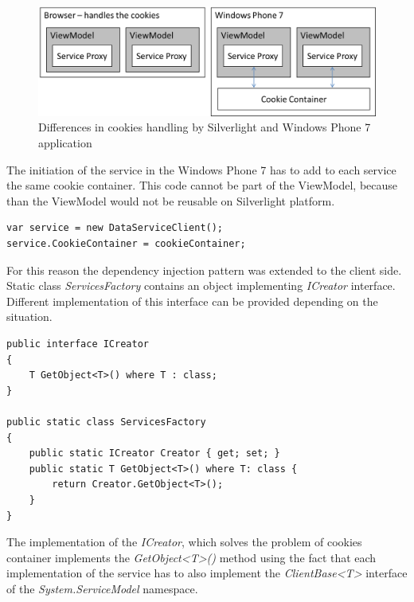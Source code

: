 \begin{figure}[h]
\begin{center}
\includegraphics[width=14cm]{figures/cookies_situation}
\caption{Differences in cookies handling by Silverlight and Windows Phone 7 application}
\label{fig:cookies_situation}
\end{center}
\end{figure}

The initiation of the service in the Windows Phone 7 has to add to each service the same cookie container. This code cannot be part of the ViewModel, because than the ViewModel would not be reusable on Silverlight platform.

\begin{verbatim}
var service = new DataServiceClient();
service.CookieContainer = cookieContainer;
\end{verbatim}

For this reason the dependency injection pattern was extended to the client side. Static class \textit{ServicesFactory} contains an object implementing \textit{ICreator} interface. Different implementation of this interface can be provided depending on the situation.

\begin{verbatim}
public interface ICreator
{
    T GetObject<T>() where T : class;
}

public static class ServicesFactory
{
    public static ICreator Creator { get; set; }
    public static T GetObject<T>() where T: class {      
        return Creator.GetObject<T>();
    }
}
\end{verbatim}

The implementation of the \textit{ICreator}, which solves the problem of cookies container implements the \textit{GetObject<T>()} method using the fact that each implementation of the service has to also implement the \textit{ClientBase<T>} interface of the \textit{System.ServiceModel} namespace.

